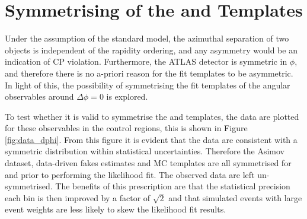 \section{Symmetrising of the \lepgamdphi and \jjdphi Templates\label{sec:vbswy:symdphi}}

Under the assumption of the standard model, the azimuthal separation of two objects is independent of the rapidity ordering, and any asymmetry would be an indication of CP violation. Furthermore, the ATLAS detector is symmetric in $\phi$, and therefore there is no a-priori reason for the fit templates to be asymmetric. In light of this, the possibility of symmetrising the fit templates of the angular observables around $\Delta\phi=0$ is explored.

To test whether it is valid to symmetrise the \lepgamdphi and \jjdphi templates, the data are plotted for these observables in the control regions, this is shown in Figure \ref{fig:data_dphi}. From this figure it is evident that the data are consistent with a symmetric distribution within statistical uncertainties. Therefore the Asimov dataset, data-driven fakes estimates and MC templates are all symmetrised for \lepgamdphi and \jjdphi prior to performing the likelihood fit. The observed data are left un-symmetrised. The benefits of this prescription are that the statistical precision each bin is then improved by a factor of $\sqrt{2}$ and that simulated events with large event weights are less likely to skew the likelihood fit results. 

